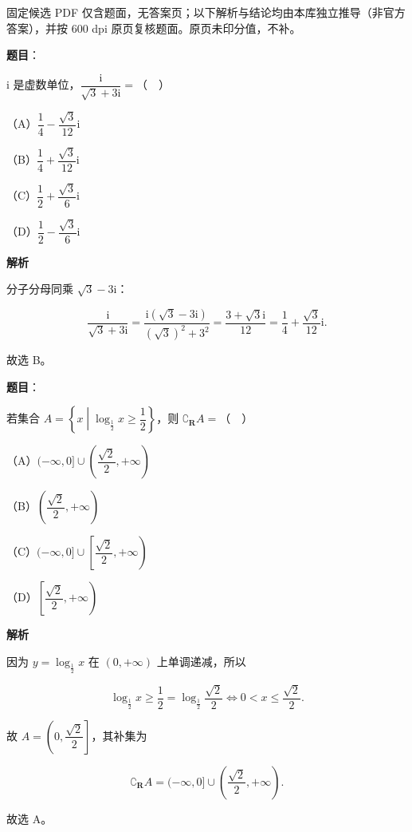 
\begin{gktip}
固定候选 PDF 仅含题面，无答案页；以下解析与结论均由本库独立推导（非官方答案），并按 600 dpi 原页复核题面。原页未印分值，不补。
\end{gktip}

\begin{answer}

\textbf{题目}：

$\mathrm i$ 是虚数单位，$\dfrac{\mathrm i}{\sqrt3+3\mathrm i}=$（　）

（A）$\dfrac14-\dfrac{\sqrt3}{12}\mathrm i$

（B）$\dfrac14+\dfrac{\sqrt3}{12}\mathrm i$

（C）$\dfrac12+\dfrac{\sqrt3}{6}\mathrm i$

（D）$\dfrac12-\dfrac{\sqrt3}{6}\mathrm i$

\textbf{解析}

分子分母同乘 $\sqrt3-3\mathrm i$：

\nopagebreak[4]
\[\frac{\mathrm i}{\sqrt3+3\mathrm i}
=\frac{\mathrm i(\sqrt3-3\mathrm i)}{(\sqrt3)^2+3^2}
=\frac{3+\sqrt3\mathrm i}{12}
=\frac14+\frac{\sqrt3}{12}\mathrm i.\]

故选 B。


\end{answer}
\begin{answer}

\textbf{题目}：

若集合 $A=\left\{x\middle|\log_{\frac12}x\geqslant\dfrac12\right\}$，则 $\complement_{\mathbf R}A=$（　）

（A）$(-\infty,0]\cup\left(\dfrac{\sqrt2}2,+\infty\right)$

（B）$\left(\dfrac{\sqrt2}2,+\infty\right)$

（C）$(-\infty,0]\cup\left[\dfrac{\sqrt2}2,+\infty\right)$

（D）$\left[\dfrac{\sqrt2}2,+\infty\right)$

\textbf{解析}

因为 $y=\log_{\frac12}x$ 在 $(0,+\infty)$ 上单调递减，所以

\nopagebreak[4]
\[\log_{\frac12}x\geqslant\frac12=\log_{\frac12}\frac{\sqrt2}2
\iff 0<x\leqslant\frac{\sqrt2}2.\]

故 $A=\left(0,\dfrac{\sqrt2}2\right]$，其补集为

\nopagebreak[4]
\[\complement_{\mathbf R}A=(-\infty,0]\cup\left(\frac{\sqrt2}2,+\infty\right).\]

故选 A。


\end{answer}

